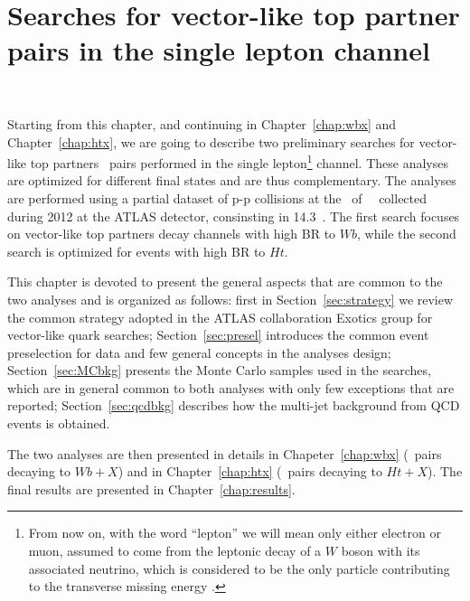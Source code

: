 \clearpage{\pagestyle{empty}\cleardoublepage}

\chapter{Searches for vector-like top partner pairs in the single lepton channel}~\label{chap:vlq}

Starting from this chapter, and continuing in Chapter~\ref{chap:wbx} 
and Chapter~\ref{chap:htx}, we are going to describe two preliminary 
searches for vector-like top partners \TTbar\ pairs performed in the single 
lepton\footnote{From now on, with the word ``lepton'' we will 
mean only either electron or muon, assumed to come from the leptonic
decay of a $W$ boson with its associated neutrino, which is considered
to be the only particle contributing to the transverse missing energy \met.} channel. 
These analyses
are optimized for different final states and are thus complementary.
The analyses are performed using a partial dataset of p-p collisions at the \cme\ 
of ~\tev\ collected during 2012 at the ATLAS detector, consinsting in  14.3~\ifb.
The first search focuses on  vector-like top partners decay channels with high BR to $Wb$, 
while the second search is optimized for events with high BR to $Ht$.

This chapter is devoted to present the general aspects that are common to 
the two analyses and is organized as follows: first in Section~\ref{sec:strategy}
we review the common strategy adopted in the ATLAS collaboration Exotics group
for vector-like quark searches; Section~\ref{sec:presel}
introduces the common event preselection for data and few general concepts in the
analyses design; Section~\ref{sec:MCbkg}
presents the Monte Carlo samples used in the searches, which
are in general common to both analyses with only few exceptions that are reported;
Section~\ref{sec:qcdbkg} describes how the multi-jet background from QCD events is
obtained.

The two analyses are then presented in details in Chapeter~\ref{chap:wbx} 
(\TTbar\ pairs decaying to $Wb+X$) and in Chapter~\ref{chap:htx}
(\TTbar\ pairs decaying to $Ht+X$). The final results are presented 
in Chapter~\ref{chap:results}.

